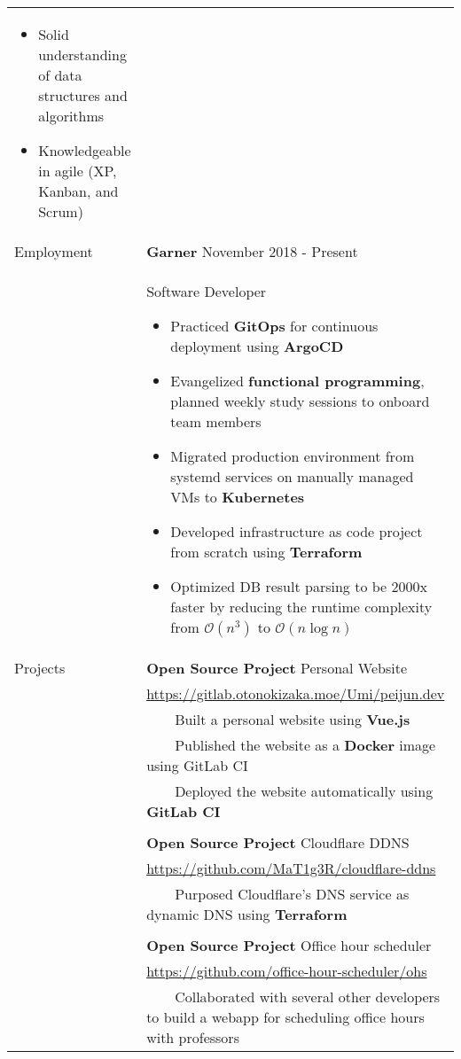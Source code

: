 \documentclass[letterpaper,12pt,oneside]{article}
\newcommand{\tabitem}{~~\llap{\textbullet}~~}
\newcommand{\smallurl}[1]{\small{\url{#1}}}
\begin{document}
\begin{longtable}{@{} l p{14cm}}
\begin{itemize}[leftmargin=*,topsep=0pt,partopsep=0pt]
      \item Solid understanding of data structures and algorithms
      \item Knowledgeable in agile (XP, Kanban, and Scrum)
\end{itemize} \\
\pagebreak
\Large{Employment}
& \large{\textbf{Garner}} November 2018 - Present\\
& Software Developer
\begin{itemize}[leftmargin=*,topsep=0pt,partopsep=0pt]
      \setlength\itemsep{0em}
      \item Practiced \textbf{GitOps} for continuous deployment using \textbf{ArgoCD}
      \item Evangelized \textbf{functional programming}, planned weekly study sessions to onboard team members
      \item Migrated production environment from systemd services on manually managed VMs to \textbf{Kubernetes}
      \item Developed infrastructure as code project from scratch using \textbf{Terraform}
      \item Optimized DB result parsing to be 2000x faster by reducing the runtime complexity from $\mathcal{O}(n^3)$ to $\mathcal{O}(n\log{}n)$
\end{itemize} \\
\Large{Projects}
& \textbf{Open Source Project} Personal Website  \\
& \smallurl{https://gitlab.otonokizaka.moe/Umi/peijun.dev} \\
& \tabitem Built a personal website using \textbf{Vue.js} \\
& \tabitem Published the website as a \textbf{Docker} image using GitLab CI \\
& \tabitem Deployed the website automatically using \textbf{GitLab CI} \\
& \\
& \textbf{Open Source Project} Cloudflare DDNS \\
& \smallurl{https://github.com/MaT1g3R/cloudflare-ddns} \\
& \tabitem Purposed Cloudflare's DNS service as dynamic DNS using \textbf{Terraform} \\
& \\
& \textbf{Open Source Project} Office hour scheduler \\
& \smallurl{https://github.com/office-hour-scheduler/ohs} \\
& \tabitem Collaborated with several other developers to build a webapp for scheduling office hours with professors \\

\end{longtable}
\end{document}
